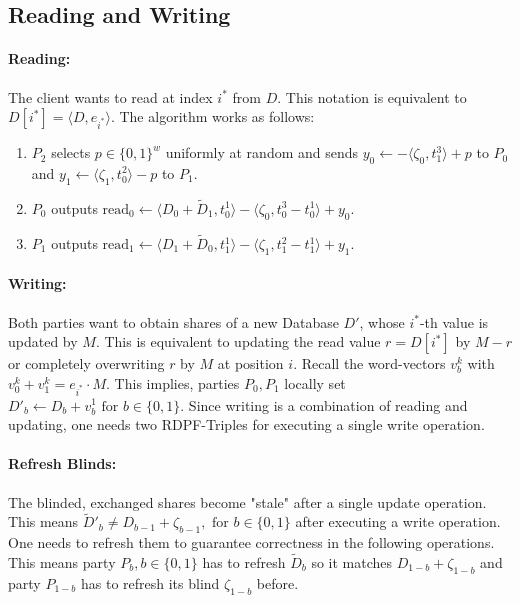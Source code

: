 \subsection{Reading and Writing}
\label{sub:DuoramReadingAndWriting}
\paragraph{Reading:}
\label{par:DuoramReading}
The client wants to read at index $i^*$ from $D$.
This notation is equivalent to $D[i^*]=\langle D,e_{i^*}\rangle$.
The algorithm works as follows:
\begin{enumerate}
    \item $P_2$ selects $p\in\{0,1\}^w$ uniformly at random and sends $y_0\leftarrow-\langle \zeta_0,t_1^3\rangle + p$ to $P_0$ and $y_1\leftarrow\langle\zeta_1,t_0^2\rangle -p$ to $P_1$.
    \item $P_0$ outputs $\text{read}_0\leftarrow\langle D_0+\widetilde{D}_1, t_0^1\rangle - \langle\zeta_0,t_0^3-t_0^1\rangle + y_0$.
    \item $P_1$ outputs $\text{read}_1\leftarrow\langle D_1+\widetilde{D}_0,t_1^1\rangle - \langle\zeta_1,t_1^2-t_1^1\rangle +y_1$.
\end{enumerate}

\paragraph{Writing:}
\label{par:DuoramWriting}
Both parties want to obtain shares of a new Database $D'$, whose $i^*$-th value is updated by $M$.
This is equivalent to updating the read value $r=D[i^*]$ by $M-r$ or completely overwriting $r$ by $M$ at position $i$.
Recall the word-vectors $v_b^k$ with $v_0^k+v_1^k=e_{i^*}\cdot M$.
This implies, parties $P_0,P_1$ locally set $D'_b\leftarrow D_b+v_b^1\text{ for }b\in\{0,1\}$.
Since writing is a combination of reading and updating, one needs two RDPF-Triples for executing a single write operation.

\paragraph{Refresh Blinds:}
\label{par:RefreshBlinds}
The blinded, exchanged shares become "stale" after a single update operation.
This means $\widetilde{D}'_b\neq D_{b-1}+\zeta_{b-1}, \text{ for } b\in\{0,1\}$ after executing a write operation.
One needs to refresh them to guarantee correctness in the following operations.
This means party $P_b, b\in\{0,1\}$ has to refresh $\widetilde{D}_b$ so it matches $D_{1-b}+\zeta_{1-b}$ and party $P_{1-b}$ has to refresh its blind $\zeta_{1-b}$ before.

